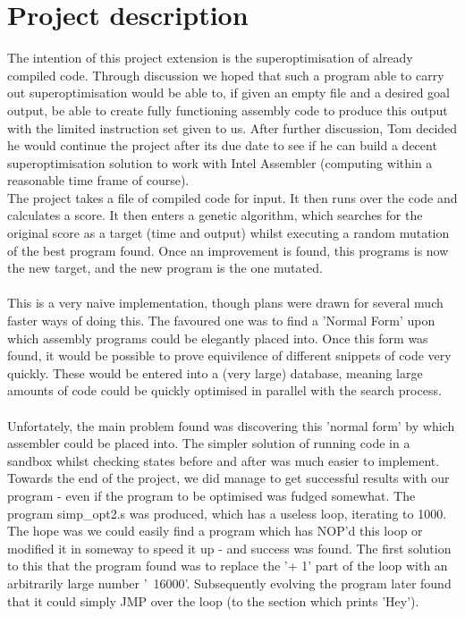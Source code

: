 \documentclass[11pt]{article}
\begin{document}
\section{Project description}
\indent The intention of this project extension is the superoptimisation of already compiled code. Through discussion we hoped that such a program able to carry out superoptimisation would be able to, if given an empty file and a desired goal output, be able to create fully functioning assembly code to produce this output with the limited instruction set given to us. After further discussion, Tom decided he would continue the project after its due date to see if he can build a decent superoptimisation solution to work with Intel Assembler (computing within a reasonable time frame of course). 
\\
\indent The project takes a file of compiled code for input. It then runs over the code and calculates a score. It then enters a genetic algorithm, which searches for the original score as a target (time and output) whilst executing a random mutation of the best program found. Once an improvement is found, this programs is now the new target, and the new program is the one mutated. 
\\
\\\indent This is a very naive implementation, though plans were drawn for several much faster ways of doing this. The favoured one was to find a 'Normal Form' upon which assembly programs could be elegantly placed into. Once this form was found, it would be possible to prove equivilence of different snippets of code very quickly. These would be entered into a (very large) database, meaning large amounts of code could be quickly optimised in parallel with the search process.
\\
\\
\indent Unfortately, the main problem found was discovering this 'normal form' by which assembler could be placed into. The simpler solution of running code in a sandbox whilst checking states before and after was much easier to implement.
\\
\indent Towards the end of the project, we did manage to get successful results with our program - even if the program to be optimised was fudged somewhat. The program simp\_opt2.s was produced, which has a useless loop, iterating to 1000. The hope was we could easily find a program which has NOP'd this loop or modified it in someway to speed it up - and success was found. The first solution to this that the program found was to replace the '+ 1' part of the loop with an arbitrarily large number '~16000'. Subsequently evolving the program later found that it could simply JMP over the loop (to the section which prints 'Hey'). 
\end{document}

